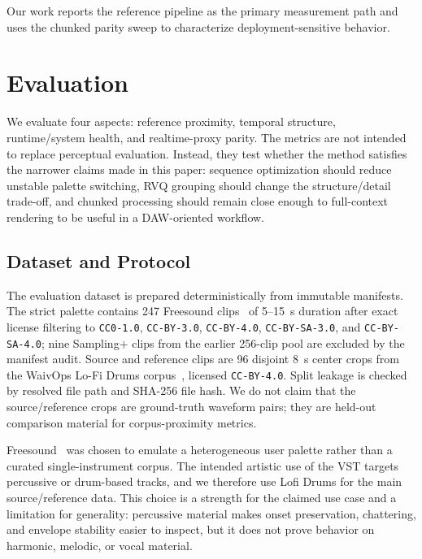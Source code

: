 \documentclass[twoside,a4paper]{article}
\begin{document}
Our work reports the reference pipeline as the primary measurement path and uses the chunked parity sweep to characterize deployment-sensitive behavior.

\section{Evaluation}\label{sec:evaluation}

We evaluate four aspects: reference proximity, temporal structure, runtime/system health, and realtime-proxy parity. The metrics are not intended to replace perceptual evaluation. Instead, they test whether the method satisfies the narrower claims made in this paper: sequence optimization should reduce unstable palette switching, RVQ grouping should change the structure/detail trade-off, and chunked processing should remain close enough to full-context rendering to be useful in a DAW-oriented workflow.

\subsection{Dataset and Protocol}

The evaluation dataset is prepared deterministically from immutable manifests. The strict palette contains 247 Freesound clips~\cite{fonseca2017freesound} of 5--15~s duration after exact license filtering to \texttt{CC0-1.0}, \texttt{CC-BY-3.0}, \texttt{CC-BY-4.0}, \texttt{CC-BY-SA-3.0}, and \texttt{CC-BY-SA-4.0}; nine Sampling+ clips from the earlier 256-clip pool are excluded by the manifest audit. Source and reference clips are 96 disjoint 8~s center crops from the WaivOps Lo-Fi Drums corpus~\cite{patchbanks_waivops_2025_lofi_drums}, licensed \texttt{CC-BY-4.0}. Split leakage is checked by resolved file path and SHA-256 file hash. We do not claim that the source/reference crops are ground-truth waveform pairs; they are held-out comparison material for corpus-proximity metrics.

Freesound~\cite{fonseca2017freesound} was chosen to emulate a heterogeneous user palette rather than a curated single-instrument corpus. The intended artistic use of the VST targets percussive or drum-based tracks, and we therefore use Lofi Drums for the main source/reference data. This choice is a strength for the claimed use case and a limitation for generality: percussive material makes onset preservation, chattering, and envelope stability easier to inspect, but it does not prove behavior on harmonic, melodic, or vocal material.
\end{document}
